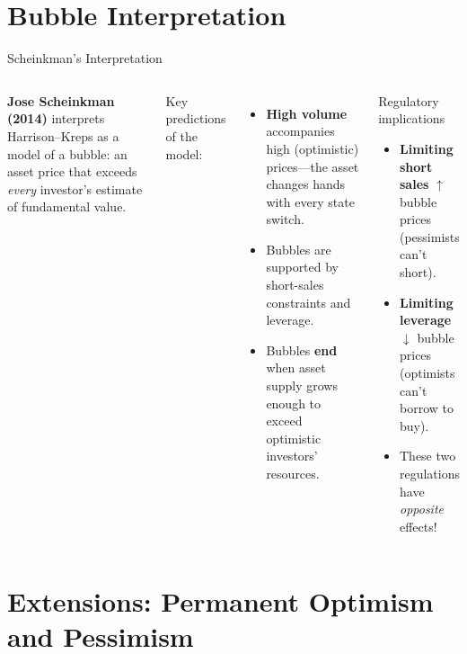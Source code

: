 \documentclass[aspectratio=169]{beamer}
\begin{document}
\section{Bubble Interpretation}

\begin{frame}{Scheinkman's Interpretation}
  \begin{columns}
    \textbf{Jose Scheinkman (2014)} interprets Harrison--Kreps as a model of a
    bubble: an asset price that exceeds \emph{every} investor's estimate of
    fundamental value.

    \medskip
    Key predictions of the model:
    \begin{itemize}
      \item \textcolor{qegreen}{\textbf{High volume}} accompanies high
            (optimistic) prices---the asset changes hands with every state
            switch.
      \item Bubbles are supported by short-sales constraints and leverage.
      \item Bubbles \textbf{end} when asset supply grows enough to exceed
            optimistic investors' resources.
    \end{itemize}

    \begin{block}{Regulatory implications}
      \begin{itemize}
        \item \textbf{Limiting short sales} $\uparrow$ bubble prices
              (pessimists can't short).
        \item \textbf{Limiting leverage} $\downarrow$ bubble prices
              (optimists can't borrow to buy).
        \item These two regulations have \emph{opposite} effects!
      \end{itemize}
    \end{block}
  \end{columns}
\end{frame}

\section{Extensions: Permanent Optimism and Pessimism}
\end{document}
